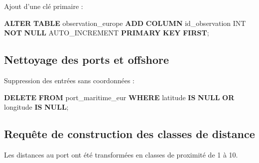 \documentclass[mstat,12pt]{unswthesis}
\newenvironment{Shaded}{\begin{snugshade}}{\end{snugshade}}
\newcommand{\DataTypeTok}[1]{\textcolor[rgb]{0.13,0.29,0.53}{#1}}
\newcommand{\FunctionTok}[1]{\textcolor[rgb]{0.13,0.29,0.53}{\textbf{#1}}}
\newcommand{\KeywordTok}[1]{\textcolor[rgb]{0.13,0.29,0.53}{\textbf{#1}}}
\newcommand{\NormalTok}[1]{#1}
\begin{document}
Ajout d'une clé primaire :

\begin{Shaded}
\begin{Highlighting}[]
\KeywordTok{ALTER} \KeywordTok{TABLE}\NormalTok{ observation\_europe}
\KeywordTok{ADD} \KeywordTok{COLUMN}\NormalTok{ id\_observation }\DataTypeTok{INT} \KeywordTok{NOT} \KeywordTok{NULL}\NormalTok{ AUTO\_INCREMENT }\KeywordTok{PRIMARY} \KeywordTok{KEY} \FunctionTok{FIRST}\NormalTok{;}
\end{Highlighting}
\end{Shaded}

\subsection{Nettoyage des ports et
offshore}\label{nettoyage-des-ports-et-offshore-1}

Suppression des entrées sans coordonnées :

\begin{Shaded}
\begin{Highlighting}[]
\KeywordTok{DELETE} \KeywordTok{FROM}\NormalTok{ port\_maritime\_eur}
\KeywordTok{WHERE}\NormalTok{ latitude }\KeywordTok{IS} \KeywordTok{NULL} \KeywordTok{OR}\NormalTok{ longitude }\KeywordTok{IS} \KeywordTok{NULL}\NormalTok{;}
\end{Highlighting}
\end{Shaded}

\subsection{Requête de construction des classes de
distance}\label{requuxeate-de-construction-des-classes-de-distance}

Les distances au port ont été transformées en classes de proximité de 1
à 10.
\end{document}
